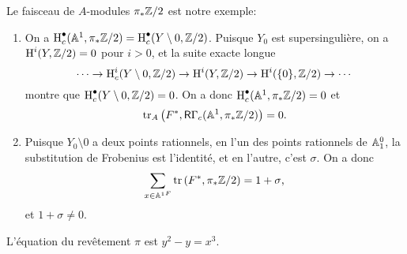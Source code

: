 Le faisceau de $A$-modules $\pi_*\mathbb{Z}/2$ est notre exemple:
\begin{enumerate}[\indent a)]
  \item On a 
    $\operatorname{H}_c^\bullet(\mathbb{A}^1,\pi_*\mathbb{Z}/2) = \operatorname{H}_c^\bullet(Y\setminus 0,\mathbb{Z}/2)$. 
    Puisque $Y_0$ est supersinguli\`ere, on a $\operatorname{H}^i(Y,\mathbb{Z}/2)=0$ pour $i>0$, et 
    la suite exacte longue 
    \[
      \cdots \to \operatorname{H}_c^i(Y\setminus 0,\mathbb{Z}/2) \to \operatorname{H}^i(Y,\mathbb{Z}/2) \to \operatorname{H}^i(\{0\},\mathbb{Z}/2) \to \cdots
    \]
    montre que $\operatorname{H}_c^\bullet(Y\setminus 0,\mathbb{Z}/2)=0$. On a donc 
    $\operatorname{H}_c^\bullet(\mathbb{A}^1,\pi_*\mathbb{Z}/2)=0$ et 
    \[
      \operatorname{tr}_A\left(F^*,\mathsf{R}\Gamma_c(\mathbb{A}^1,\pi_*\mathbb{Z}/2)\right) = 0 \text{.}
    \]
  \item Puisque $Y_0\setminus 0$ a deux points rationnels, en l'un des points 
    rationnels de $\mathbb{A}_1^0$, la substitution de Frobenius est l'identit\'e, et 
    en l'autre, c'est $\sigma$. On a donc 
    \[
      \sum_{x\in {\mathbb{A}^1}^F} \operatorname{tr}\left(F^*,\pi_*\mathbb{Z}/2\right) = 1+\sigma \text{,}
    \]
    et $1+\sigma\ne 0$.
\end{enumerate}

L'\'equation du rev\^etement $\pi$ est $y^2-y=x^3$.